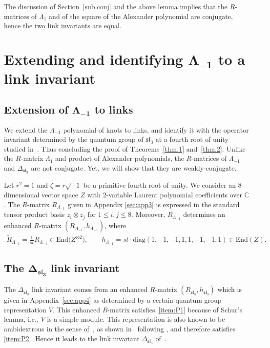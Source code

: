 \documentclass[10pt,a4paper]{amsart}
\numberwithin{equation}{section}
\theoremstyle{definition}
\begin{document}
The discussion of Section~\ref{sub.conj} and the above lemma
implies that the $R$-matrices of $\Lambda_1$ and of the square of the Alexander
polynomial are conjugate, hence the two link invariants are equal.

\section[Extending and identifying Lambda\_\{-1\} to a link invariant]{Extending and identifying $\boldsymbol{\Lambda_{-1}}$ to a link invariant}
\label{sec:Lm1}

\subsection[Extension of Lambda\_\{-1\} to links]{Extension of $\boldsymbol{\Lambda_{-1}}$ to links}

We extend the $\Lambda_{-1}$ polynomial of knots to links, and identify it with the
operator invariant determined by the quantum group of $\mathfrak{sl}_3$ at a fourth root
of unity studied in~\cite{Harper}. Thus
concluding the proof of Theorems~\ref{thm.1} and~\ref{thm.2}.
Unlike the $R$-matrix $\Lambda_1$ and product of Alexander polynomials, the
$R$-matrices of $\Lambda_{-1}$ and $\Delta_{\mathfrak{sl}_3}$ are not conjugate. Yet, we
will show that they are weakly-conjugate.

Let $r^2=1$ and $\zeta=r\sqrt{-1}$ be a primitive fourth root of unity. We consider
an 8-dimensional vector space $Z$ with 2-variable Laurent polynomial coefficients
over $\mathbb{C}$. The $R$-matrix $R_{\Lambda_{-1}}$ given in Appendix \ref{sec:app3} is
expressed in the standard tensor product basis $z_i\otimes z_j$ for $1\leq i,j\leq 8$.
Moreover, $R_{\Lambda_{-1}}$ determines an enhanced $R$-matrix
$(\tilde{R}_{\Lambda_{-1}},h_{\Lambda_{-1}})$, where
\begin{gather*}
\tilde{R}_{\Lambda_{-1}}=\frac{1}{st}R_{\Lambda_{-1}}\in\mathrm{End}\bigl(Z^{\otimes 2}\bigr),\qquad
h_{\Lambda_{-1}}=st \cdot\mathrm{diag}(1,-1,-1,1,1,-1,-1,1) \in \mathrm{End}(Z) .
\end{gather*}

\subsection[The Delta\_\{sl\_3\} link invariant]{The $\boldsymbol{\Delta_{\mathfrak{sl}_3}}$ link invariant}

The $\Delta_{\mathfrak{sl}_3}$ link invariant comes from an enhanced $R$-matrix
$(R_{\mathfrak{sl}_3},h_{\mathfrak{sl}_3})$ which is given in Appendix~\ref{sec:app4} as determined
by a certain quantum group representation $V$.
This enhanced $R$-matrix satisfies~\eqref{item:P1} because of Schur's lemma, i.e.,
$V$ is a simple module. This representation is also known to be ambidextrous in the
sense of~\cite{GPT}, as shown in~\cite{Harper} following \cite{GP13}, and therefore
satisfies \eqref{item:P2}. Hence it leads to the link invariant $\Delta_{\mathfrak{sl}_3}$
of~\cite{Harper}.
\end{document}
